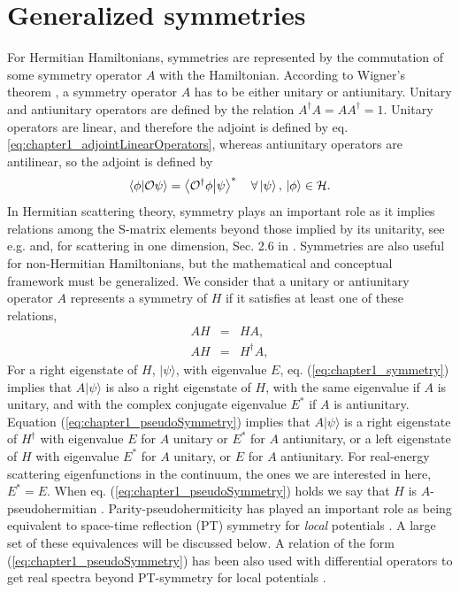\section{Generalized symmetries\label{sec:chapter1_generalizedSymmetries}}

For Hermitian  Hamiltonians, symmetries are represented by the commutation of some symmetry operator $A$ with the Hamiltonian. According to Wigner's theorem \cite{Wigner1959}, a symmetry operator $A$ has to be either unitary or antiunitary. Unitary and antiunitary operators are defined by the relation $A^\dagger A = A A^\dagger = 1$. Unitary operators are linear, and therefore the adjoint is defined by eq. \eqref{eq:chapter1_adjointLinearOperators}, whereas antiunitary operators are antilinear, so the adjoint is defined by
%
\begin{equation}
  \braket{\phi}{\mathcal{O}\psi} = \braket{\mathcal{O}^\dagger\phi}{\psi}^*\quad\forall\ket{\psi},\,\ket{\phi}\in\mathcal{H}.
  \label{eq:chapter1_adjointAntiLinearOperators}
\end{equation}
%
In Hermitian scattering theory, symmetry plays an important role  as it implies relations among
the S-matrix elements beyond those implied by its unitarity, see e.g. \cite{Taylor1972} and, for scattering in one dimension, Sec. 2.6 in \cite{Muga2004}. Symmetries are also useful for  non-Hermitian Hamiltonians, but the mathematical and conceptual
framework must be generalized. We consider that a unitary or antiunitary operator $A$ represents a symmetry of $H$ if it satisfies at least one of these relations,
%
\begin{eqnarray}
  AH&=&HA,
  \label{eq:chapter1_symmetry}
  \\
  AH&=&H^\dagger A,
  \label{eq:chapter1_pseudoSymmetry}
\end{eqnarray}
%
For a right eigenstate of $H$, $|\psi\rangle$,
with eigenvalue $E$, eq. (\ref{eq:chapter1_symmetry}) implies that
$A|\psi\rangle$ is also a right  eigenstate of $H$, with the
same eigenvalue if $A$ is unitary, and with the complex conjugate eigenvalue $E^*$ if $A$ is antiunitary.
Equation (\ref{eq:chapter1_pseudoSymmetry}) implies that $A|\psi\rangle$ is a right eigenstate of $H^\dagger$
with eigenvalue $E$ for $A$ unitary or $E^*$ for $A$ antiunitary, or a left eigenstate of $H$ with eigenvalue $E^*$ for $A$ unitary, or $E$
for $A$ antiunitary. For real-energy scattering
eigenfunctions in the continuum, the ones we are interested in here, $E^*=E$.
When eq. (\ref{eq:chapter1_pseudoSymmetry}) holds we say that $H$ is $A$-pseudohermitian \cite{Mostafazadeh2010}.
Parity-pseudohermiticity has played an important role as being equivalent to space-time reflection (PT) symmetry for {\it local} potentials
\cite{Mostafazadeh2010,Znojil2015}. A large set of these equivalences
will be discussed below.
A relation of the form (\ref{eq:chapter1_pseudoSymmetry}) has been also used with differential operators  to get real spectra beyond
PT-symmetry for local potentials  \cite{Nixon2016,Nixon2016a}.

